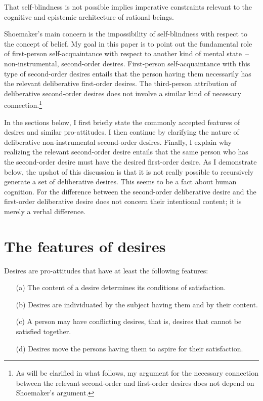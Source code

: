 \documentclass[output=paper]{langscibook}
\begin{document}
That self-blindness is not possible implies imperative constraints relevant to the cognitive and epistemic architecture of rational beings.

Shoemaker’s main concern is the impossibility of self-blindness with respect to the concept of belief. My goal in this paper is to point out the fundamental role of first-person self-acquaintance with respect to another kind of mental state~– non-instrumental, second-order desires. First-person self-acquaintance with this type of second-order desires entails that the person having them necessarily has the relevant deliberative first-order desires. The third-person attribution of deliberative second-order desires does not involve a similar kind of necessary connection.\footnote{As will be clarified in what follows, my argument for the necessary connection between the relevant second-order and first-order desires does not depend on Shoemaker's argument.}
	
	In the sections below, I first briefly state the commonly accepted features of desires and similar pro-attitudes. I then continue by clarifying the nature of deliberative non-instrumental second-order desires. Finally, I explain why realizing the relevant second-order desire entails that the same person who has the second-order desire must have the desired first-order desire. As I demonstrate below, the upshot of this discussion is that it is not really possible to recursively generate a set of deliberative desires. This seems to be a fact about human cognition. For the difference between the second-order deliberative desire and the first-order deliberative desire does not concern their intentional content; it is merely a verbal difference.
	
\section{The features of desires}

Desires are pro-attitudes that have at least the following features:

\begin{itemize}
\item[(a)]	The content of a desire determines its conditions of satisfaction. 

\item[(b)]	Desires are individuated by the subject having them and by their content.

\item[(c)]	A person may have conflicting desires, that is, desires that cannot be satisfied together. 

\item[(d)]	Desires move the persons having them to aspire for their satisfaction.
\end{itemize}
\end{document}
